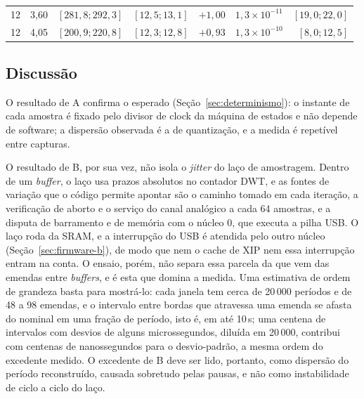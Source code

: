 \begin{table}[H]
{\begin{tabular}{@{}rrrrrrr@{}}
    12 & 3{,}60 & $[281{,}8; 292{,}3]$ & $[12{,}5; 13{,}1]$ & $+1{,}00$ & $1{,}3 \times 10^{-11}$ & $[19{,}0; 22{,}0]$ \\
    12 & 4{,}05 & $[200{,}9; 220{,}8]$ & $[12{,}3; 12{,}8]$ & $+0{,}93$ & $1{,}3 \times 10^{-10}$ & $[8{,}0; 12{,}5]$ \\
    \bottomrule
  \end{tabular}}
\end{table}

\subsection{Discussão}

O resultado de A confirma o esperado (Seção~\ref{sec:determinismo}): o
instante de cada amostra é fixado pelo divisor de clock da máquina de
estados e não depende de software; a dispersão observada é a de
quantização, e a medida é repetível entre capturas.

O resultado de B, por sua vez, não isola o \emph{jitter} do laço de
amostragem. Dentro de um \emph{buffer}, o laço usa prazos absolutos no
contador \ac{DWT}, e as fontes de variação que o código permite apontar são o
caminho tomado em cada iteração, a verificação de aborto e o serviço do canal
analógico a cada 64 amostras, e a disputa de barramento e de memória com o
núcleo 0, que executa a pilha \ac{USB}. O laço roda da \ac{SRAM}, e a
interrupção do \ac{USB} é atendida pelo outro núcleo
(Seção~\ref{sec:firmware-b}), de modo que nem o cache de \acs{XIP} nem essa
interrupção entram na conta. O ensaio, porém, não separa essa parcela da que
vem das emendas entre \emph{buffers}, e é esta que domina a medida. Uma
estimativa de ordem de grandeza basta para mostrá-lo: cada janela tem cerca
de 20\,000 períodos e de 48 a 98 emendas, e o intervalo entre bordas que
atravessa uma emenda se afasta do nominal em uma fração de período, isto é,
em até 10\,\textmu s; uma centena de intervalos com desvios de alguns
microssegundos, diluída em 20\,000, contribui com centenas de nanossegundos
para o desvio-padrão, a mesma ordem do excedente medido. O excedente de B
deve ser lido, portanto, como dispersão do período reconstruído, causada
sobretudo pelas pausas, e não como instabilidade de ciclo a ciclo do laço.

